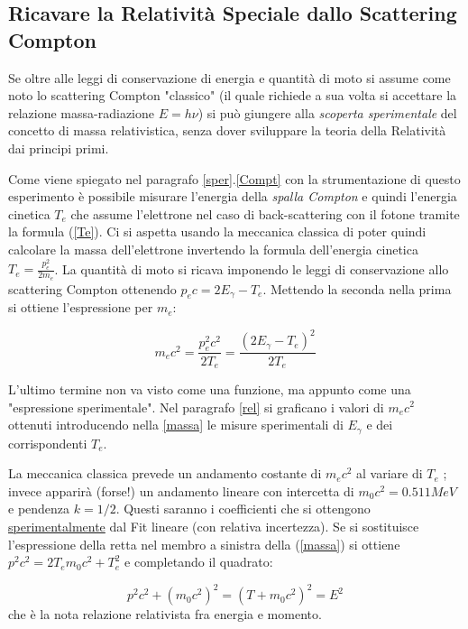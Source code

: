 \documentclass[12pt,a4paper,openright,twoside]{article}
\numberwithin{equation}{section} %
\begin{document}
\subsection{Ricavare la Relatività Speciale dallo Scattering Compton}
Se oltre alle leggi di conservazione di energia e quantità di moto si assume come noto lo scattering Compton "classico" (il quale richiede a sua volta si accettare la relazione massa-radiazione $E=h \nu$) si può giungere alla \textit{scoperta sperimentale} del concetto di massa relativistica, senza dover sviluppare la teoria della Relatività dai principi primi.

Come viene spiegato nel paragrafo \ref{sper}.\ref{Compt} con la strumentazione di questo esperimento è possibile misurare l'energia della \textit{spalla Compton} e quindi l'energia cinetica $T_e$ che assume l'elettrone nel caso di back-scattering con il fotone tramite la formula (\ref{Te}).
Ci si aspetta usando la meccanica classica di poter quindi calcolare la massa dell'elettrone invertendo la formula dell'energia cinetica $T_e=\frac{p_{e} ^2}{2 m_e}$. La quantità di moto si ricava imponendo le leggi di conservazione allo scattering Compton ottenendo $p_e c=2E_{\gamma}-T_e$.
Mettendo la seconda nella prima si ottiene l'espressione per $m_e$:

\begin{equation} \label{massa}
m_e c^2=\frac{p_{e} ^2 c^2}{2 T_e} = \frac{(2E_{ \gamma }-T_e)^2}{2T_e}
\end{equation}

L'ultimo termine non va visto come una funzione, ma appunto come una "espressione sperimentale". Nel paragrafo \ref{rel} si graficano i valori di $m_e c^2$ ottenuti introducendo nella \ref{massa} le misure sperimentali di $E_{\gamma}$ e dei corrispondenti $T_e$.

La meccanica classica prevede un andamento costante di $m_e c^2$ al variare di $T_e$ ; invece apparirà (forse!) un andamento lineare con intercetta di $m_0 c^2 =0.511 MeV$ e pendenza $k=1/2$. Questi saranno i coefficienti che si ottengono \underline{sperimentalmente} dal Fit lineare (con relativa incertezza). Se si sostituisce l'espressione della retta nel membro a sinistra della (\ref{massa}) si ottiene $p^2 c^2 = 2 T_{e} m_0 c^2 + T_{e} ^2 $ e completando il quadrato:

\begin{equation}
p^2 c^2 + (m_0 c^2 )^2 = (T + m_0 c^2)^2 = E^2
\end{equation}
 che è la nota relazione relativista fra energia e momento.
\end{document}

